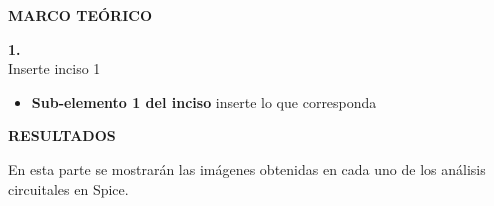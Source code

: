 \documentclass[12pt]{article}
\begin{document}
	\newpage
	
	
	\begin{center}
		\textbf{\large MARCO TEÓRICO}\\
	\end{center}
	
	\textbf{1. }\\
	
	Inserte inciso 1
	
	\begin{itemize}
		\item \textbf{Sub-elemento 1 del inciso } inserte lo que corresponda
		
	\end{itemize}
	
	\newpage
	
	\begin{center}
		\textbf{\large RESULTADOS}\\
	\end{center}
	

	En esta parte se mostrarán las imágenes obtenidas en cada uno de los análisis circuitales en Spice.\\
	
\end{document}
